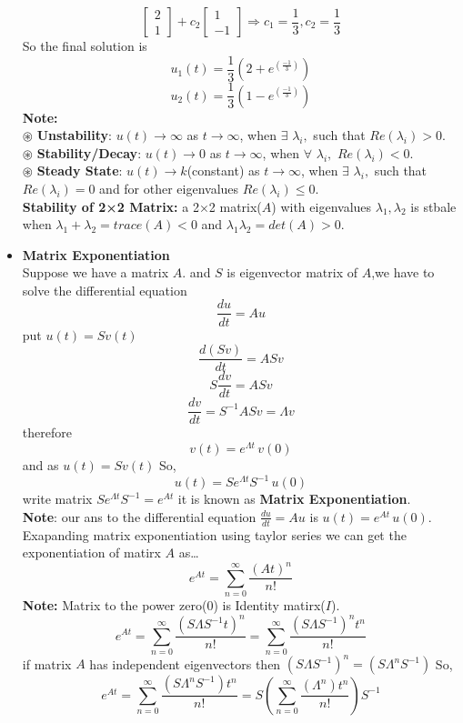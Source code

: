 \documentclass[a4paper,11pt]{article}
\numberwithin{equation}{section}
\begin{document}
\begin{itemize}
\[\begin{bmatrix}
    2\\1
\end{bmatrix}+c_2\begin{bmatrix}
    1\\-1
\end{bmatrix} \Longrightarrow c_1=\frac{1}{3},c_2=\frac{1}{3}
\]
So the final solution is
\[
u_1(t)=\frac{1}{3}\left(2+e^{(\frac{-1}{3})}\right)
\]
\[
u_2(t)=\frac{1}{3}\left(1-e^{(\frac{-1}{3})}\right)
\]
\textbf{Note: }\\
$\circledast$ \textbf{Unstability}: $u(t)\rightarrow \infty$ as $t\rightarrow \infty$, when $\exists$ $\lambda_i,$ such that $Re(\lambda_i)>0$. \\ 
$\circledast$ \textbf{Stability/Decay}: $u(t)\rightarrow 0$ as $t\rightarrow \infty$, when $\forall$ $\lambda_i,$  $Re(\lambda_i)<0$. \\ 
$\circledast$ \textbf{Steady State}: $u(t)\rightarrow k$(constant) as $t\rightarrow \infty$, when $\exists$ $\lambda_i,$ such that $Re(\lambda_i)=0$ and for other eigenvalues $Re(\lambda_i)\leq 0$.\\

\textbf{Stability of 2×2 Matrix: }a 2×2 matrix($A$) with eigenvalues $\lambda_1,\lambda_2$ is stbale when $\lambda_1+\lambda_2=trace(A)<0$ and $\lambda_1\lambda_2=det(A)>0$.\\

\item \textbf{Matrix Exponentiation}\\

Suppose we have a matrix $A$. and $S$ is eigenvector matrix of $A$,we have to solve the differential equation
\[
\frac{du}{dt}=Au 
\]
put $u(t)=Sv(t)$
\[
\frac{d(Sv)}{dt}=ASv
\]
\[
S\frac{dv}{dt}=ASv
\]
\[
\frac{dv}{dt}=S^{-1}ASv=\varLambda v
\]
therefore
\[
v(t)=e^{\varLambda t}\hspace{2pt}v(0)
\]
and as $u(t)=Sv(t)$ So,
\[
u(t)=Se^{\varLambda t}S^{-1}\hspace{2pt}u(0)
\]
write matrix $Se^{\varLambda t}S^{-1}=e^{At}$ it is known as \textbf{Matrix Exponentiation}.\\

\textbf{Note}: our ans to the differential equation $\frac{du}{dt}=Au$ is $u(t)=e^{At}\hspace{2pt} u(0)$.\\

Exapanding matrix exponentiation using taylor series we can get the exponentiation of matirx $A$ as\dots
\[
e^{At}=\sum_{n=0}^{\infty} \frac{(At)^n}{n!}
\]
\textbf{Note: }Matrix to the power zero($0$) is Identity matirx($I$).
\[
e^{At}=\sum_{n=0}^{\infty} \frac{(S\varLambda S^{-1}t)^n}{n!}=\sum_{n=0}^{\infty} \frac{(S\varLambda S^{-1})^nt^n}{n!}
\]
if matrix $A$ has independent eigenvectors then $(S\varLambda S^{-1})^n=(S\varLambda^n S^{-1})$
So,
\[
e^{At}=\sum_{n=0}^{\infty} \frac{(S\varLambda^n S^{-1})t^n}{n!}=S\left(\sum_{n=0}^{\infty} \frac{(\varLambda^n)t^n}{n!}\right)S^{-1}
\]


\end{itemize}
\end{document}
